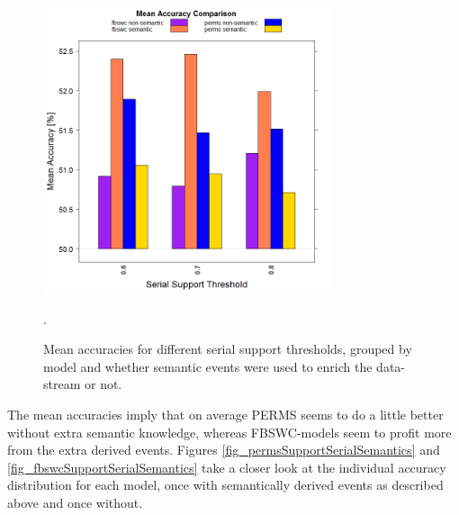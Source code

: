 \begin{figure}[h]
	\centering
  	\includegraphics[width=0.75\textwidth]{semanticVsNonSemanticAccuracy}
	\caption{Mean accuracies for different serial support thresholds, grouped by model and whether semantic events were used to enrich the data-stream or not.}.
	\label{fig_semanticVsNonSemanticAccuracy}
\end{figure}

The mean accuracies imply that on average PERMS seems to do a little better without extra semantic knowledge, whereas FBSWC-models seem to profit more from the extra derived events. Figures \ref{fig_permsSupportSerialSemantics} and \ref{fig_fbswcSupportSerialSemantics} take a closer look at the individual accuracy distribution for each model, once with semantically derived events as described above and once without.


